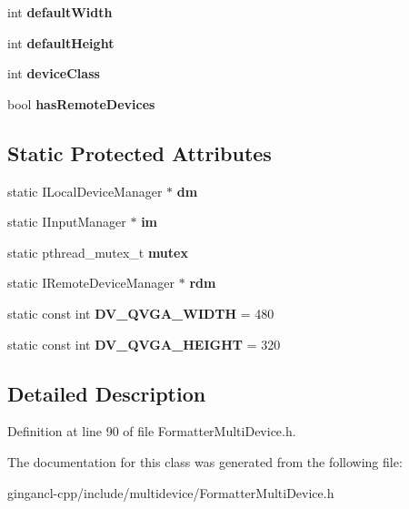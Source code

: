 \begin{CompactItemize}
\item 
int {\bf defaultWidth}\label{classbr_1_1pucrio_1_1telemidia_1_1ginga_1_1ncl_1_1multidevice_1_1FormatterMultiDevice_b28500680f98c1342885f2884941e8e1}

\item 
int {\bf defaultHeight}\label{classbr_1_1pucrio_1_1telemidia_1_1ginga_1_1ncl_1_1multidevice_1_1FormatterMultiDevice_6f1ab9433a9e682244bd74e3f8a6fd9d}

\item 
int {\bf deviceClass}\label{classbr_1_1pucrio_1_1telemidia_1_1ginga_1_1ncl_1_1multidevice_1_1FormatterMultiDevice_504d195f469c9e19746101fc85a24cd0}

\item 
bool {\bf hasRemoteDevices}\label{classbr_1_1pucrio_1_1telemidia_1_1ginga_1_1ncl_1_1multidevice_1_1FormatterMultiDevice_105374c45ef9955067e3b9a401c1f969}

\end{CompactItemize}
\subsection*{Static Protected Attributes}
\begin{CompactItemize}
\item 
static ILocalDeviceManager $\ast$ {\bf dm}\label{classbr_1_1pucrio_1_1telemidia_1_1ginga_1_1ncl_1_1multidevice_1_1FormatterMultiDevice_059153e9dab354e59c386543c6ba63cc}

\item 
static IInputManager $\ast$ {\bf im}\label{classbr_1_1pucrio_1_1telemidia_1_1ginga_1_1ncl_1_1multidevice_1_1FormatterMultiDevice_1a7a3c6296297c71a86bc018607fdcfe}

\item 
static pthread\_\-mutex\_\-t {\bf mutex}\label{classbr_1_1pucrio_1_1telemidia_1_1ginga_1_1ncl_1_1multidevice_1_1FormatterMultiDevice_4acff8232e4aec9cd5c6dc200ac55ef3}

\item 
static IRemoteDeviceManager $\ast$ {\bf rdm}\label{classbr_1_1pucrio_1_1telemidia_1_1ginga_1_1ncl_1_1multidevice_1_1FormatterMultiDevice_b8e82a9bb97833fb3314d27b2ba13a89}

\item 
static const int {\bf DV\_\-QVGA\_\-WIDTH} = 480\label{classbr_1_1pucrio_1_1telemidia_1_1ginga_1_1ncl_1_1multidevice_1_1FormatterMultiDevice_1d64e3eafa97cc45d2e8a49be7711e77}

\item 
static const int {\bf DV\_\-QVGA\_\-HEIGHT} = 320\label{classbr_1_1pucrio_1_1telemidia_1_1ginga_1_1ncl_1_1multidevice_1_1FormatterMultiDevice_9df9a317a021753b5c03abd825b20e1d}

\end{CompactItemize}


\subsection{Detailed Description}




Definition at line 90 of file FormatterMultiDevice.h.

The documentation for this class was generated from the following file:\begin{CompactItemize}
\item 
gingancl-cpp/include/multidevice/FormatterMultiDevice.h\end{CompactItemize}
